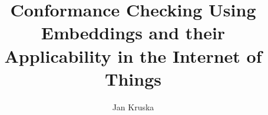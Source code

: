 \documentclass[runningheads]{template/llncs}
\begin{document}
%
\title{Conformance Checking Using Embeddings and their Applicability in the Internet of Things}
%
%
\author{Jan Kruska}
%
%
%
\maketitle              %
%
%
%
%
\end{document}
